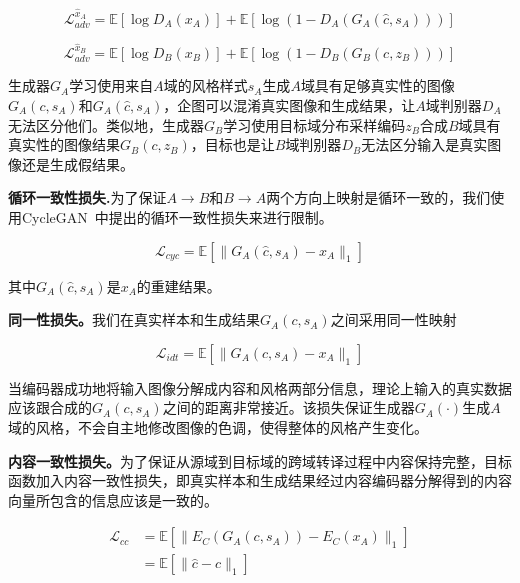 \begin{equation}
\label{equ:adv_a}
\mathcal{L}_{adv}^{\hat{x}_A} = \mathbb{E}[\log D_A(x_A)] + \mathbb{E}[\log(1-D_A(G_A(\hat{c},s_A)))]
\end{equation}

\begin{equation}
\label{equ:adv_b}
\mathcal{L}_{adv}^{\hat{x}_B} = \mathbb{E}[\log D_B(x_B)] + \mathbb{E}[\log(1-D_B(G_B(c,z_B)))]
\end{equation}

生成器$G_A$学习使用来自$A$域的风格样式$s_A$生成$A$域具有足够真实性的图像$G_A(c,s_A)$和$G_A(\hat{c},s_A)$，企图可以混淆真实图像和生成结果，让$A$域判别器$D_A$无法区分他们。类似地，生成器$G_B$学习使用目标域分布采样编码$z_B$合成$B$域具有真实性的图像结果$G_B(c,z_B)$，目标也是让$B$域判别器$D_B$无法区分输入是真实图像还是生成假结果。

\textbf{循环一致性损失.}为了保证$A \rightarrow B$和$B \rightarrow A$两个方向上映射是循环一致的，我们使用CycleGAN~\cite{zhu2017unpaired}中提出的循环一致性损失来进行限制。

\begin{equation}
\label{equ:cycle}
\mathcal{L}_{cyc} = \mathbb{E}[\| G_A(\hat{c}, s_A) - x_A \|_1]
\end{equation}

其中$G_A(\hat{c}, s_A)$是$x_A$的重建结果。

\textbf{同一性损失。}我们在真实样本和生成结果$G_A(c,s_A)$之间采用同一性映射

\begin{equation}
\label{equ:idt}
\mathcal{L}_{idt} = \mathbb{E}[\| G_A(c, s_A) - x_A \|_1]
\end{equation}

当编码器成功地将输入图像分解成内容和风格两部分信息，理论上输入的真实数据应该跟合成的$G_A(c,s_A)$之间的距离非常接近。该损失保证生成器$G_A(\cdot)$生成$A$域的风格，不会自主地修改图像的色调，使得整体的风格产生变化。

\textbf{内容一致性损失。}为了保证从源域到目标域的跨域转译过程中内容保持完整，目标函数加入内容一致性损失，即真实样本和生成结果经过内容编码器分解得到的内容向量所包含的信息应该是一致的。

\begin{equation}
\label{equ:cc}
\begin{aligned}
\mathcal{L}_{cc} & = \mathbb{E}[\| E_C(G_A(c, s_A)) - E_C(x_A) \|_1] \\
       & = \mathbb{E}[\| \hat{c} - c \|_1]
\end{aligned}
\end{equation}

